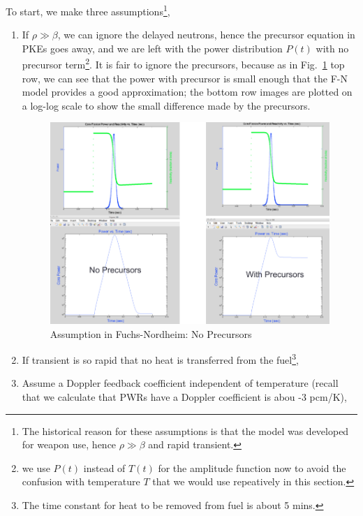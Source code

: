 \documentclass{school-22.211-notes}
\begin{document}
To start, we make three assumptions\footnote{The historical reason for these assumptions is that the model was developed for weapon use, hence $\rho \gg \beta$ and rapid transient.}, 
\begin{enumerate}
\item If $\rho \gg \beta$, we can ignore the delayed neutrons, hence the precursor equation in PKEs goes away, and we are left with the power distribution $P(t)$ with no precursor term\footnote{we use $P(t)$ instead of $T(t)$ for the amplitude function now to avoid the confusion with temperature $T$ that we would use repeatively in this section.}. 
  It is fair to ignore the precursors, because as in Fig.~\ref{fn1} top row, we can see that the power with precursor is small enough that the F-N model provides a good approximation; the bottom row images are plotted on a log-log scale to show the small difference made by the precursors.  
\begin{figure}[ht]
  \centering
  \includegraphics[width=6in]{images/pke/fn1.png}
  \caption{Assumption in Fuchs-Nordheim: No Precursors}\label{fn1}
\end{figure}

\item If transient is so rapid that no heat is transferred from the fuel\footnote{The time constant for heat to be removed from  fuel is about 5 mins.}, 

\item Assume a Doppler feedback coefficient independent of temperature (recall that we calculate that PWRs have a Doppler coefficient is abou -3 pcm/K), 
\end{enumerate}
\end{document}
